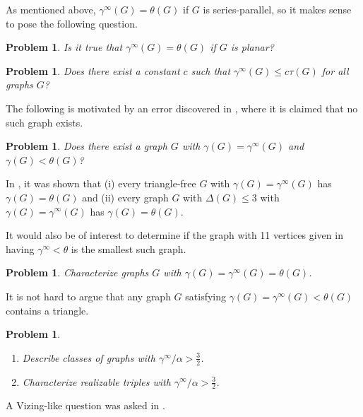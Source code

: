 \documentclass[12pt]{article}%
\newtheorem{problem}[theorem]{Problem}
\begin{document}
As mentioned above, $\gamma^{\infty}(G)=\theta(G)$ if $G$ is series-parallel,
so it makes sense to pose the following question.

\begin{problem}
Is it true that $\gamma^{\infty}(G)=\theta(G)$ if $G$ is planar?
\end{problem}

\begin{problem}
Does there exist a constant $c$ such that $\gamma^{\infty}(G)\leq c\tau(G)$
for all graphs $G$?
\end{problem}

The following is motivated by an error discovered in \cite{KM2}, where it is
claimed that no such graph exists.

\begin{problem}
\label{counterexm} Does there exist a graph $G$ with $\gamma(G)=\gamma
^{\infty}(G)$ and $\gamma(G)<\theta(G)$?
\end{problem}

In \cite{KM8}, it was shown that (i) every triangle-free $G$ with
$\gamma(G)=\gamma^{\infty}(G)$ has $\gamma(G)=\theta(G)$ and (ii) every graph
$G$ with $\Delta(G) \leq3$ with $\gamma(G)=\gamma^{\infty}(G)$ has
$\gamma(G)=\theta(G)$.

It would also be of interest to determine if the graph with 11 vertices given
in \cite{GHH} having $\gamma^{\infty}<\theta$ is the smallest such graph.

\begin{problem}
\label{gamma-prob}\emph{\cite{KM2}\hspace{0.1in}}Characterize graphs $G$ with
$\gamma(G)=\gamma^{\infty}(G)=\theta(G)$.
\end{problem}

It is not hard to argue that any graph $G$ satisfying $\gamma(G)=\gamma
^{\infty}(G)<\theta(G)$ contains a triangle.

\begin{problem}


\begin{enumerate}
\item[\emph{(a)}] Describe classes of graphs with $\gamma^{\infty}%
/\alpha>\frac{3}{2}$.

\item[\emph{(b)}] Characterize realizable triples with $\gamma^{\infty}%
/\alpha>\frac{3}{2}$.
\end{enumerate}
\end{problem}

A Vizing-like question was asked in \cite{KM8}.
\end{document}
